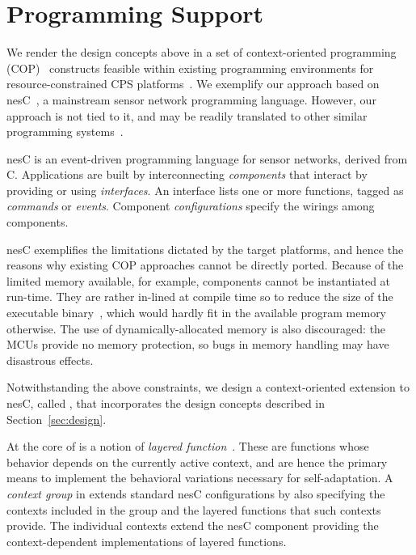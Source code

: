 \section{Programming Support}
\label{sec:conesc}

We render the design concepts above in a set of context-oriented
programming (COP)~\cite{Hirschfeld08} constructs feasible within
existing programming environments for resource-constrained CPS
platforms~\cite{mottola10:survey}.  We exemplify our approach based on
nesC~\cite{gay03nesc}, a mainstream sensor network programming
language. However, our approach is not tied to it, and may be readily
translated to other similar programming systems~\cite{mottola10:survey}.

 nesC is an event-driven programming language
for sensor networks, derived from C. Applications are built by
interconnecting \emph{components} that interact by providing or using
\emph{interfaces}. An interface lists one or more functions, tagged as
\emph{commands} or \emph{events}. %
Component \emph{configurations} specify the wirings among
components. %

nesC exemplifies the limitations dictated by the target platforms, and
hence the reasons why existing COP approaches cannot be directly
ported. Because of the limited memory available, for example,
components cannot be instantiated at run-time. They are rather
in-lined at compile time so to reduce the size of the executable
binary~\cite{gay03nesc}, which would hardly fit in the available
program memory otherwise.  The use of dynamically-allocated memory is
also discouraged: the MCUs provide no memory protection, so bugs in
memory handling may have disastrous effects.

\fakepar{\conesc} Notwithstanding the above constraints, we design a
context-oriented extension to nesC, called \conesc, that incorporates
the design concepts described in Section~\ref{sec:design}. 

At the core of \conesc is a notion of \emph{layered
  function}~\cite{Hirschfeld08}. These are functions whose behavior
depends on the currently active context, and are hence the primary
means to implement the behavioral variations necessary for
self-adaptation. A \emph{context group} in \conesc extends standard
nesC configurations by also specifying the contexts included in the
group and the layered functions that such contexts provide. The
individual contexts extend the nesC component providing the
context-dependent implementations of layered functions.

